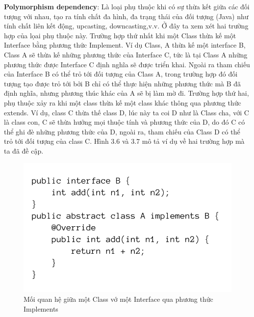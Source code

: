 \documentclass[12pt]{report}
\begin{document}
\noindent \textbf{Polymorphism dependency}: Là loại phụ thuộc khi có sự thừa kết giữa các đối tượng với nhau, tạo ra tính chất đa hình, đa trạng thái của đối tượng (Java) như tính chất liên kết động, upcasting, downcasting,v.v. Ở đây ta xem xét hai trường hợp của lọai phụ thuộc này. Trường hợp thứ nhất khi một Class thừa kế một Interface bằng phương thức Implement. Ví dụ Class, A  thừa kế một interface B, Class A sẽ thừa kế những phương thức của Interface C, tức là tại Class A những phương thức được Interface C định nghĩa sẽ được triển khai. Ngoài ra tham chiếu của Interface B có thể trỏ tới đối tượng của Class A, trong trường hợp đó đối tượng tạo được trỏ tới bởi B chỉ có thể thực hiện những phương thức mà B đã định nghĩa, nhưng phương thúc khác của A sẽ bị làm mờ đi. Trường hợp thứ hai, phụ thuộc xảy ra khi một class thừa kế một class khác thông qua phương thức extends. Ví dụ, class C thừa thế class D, lúc này ta coi D như là Class cha, với C là class con, C sẽ thừa hưởng mọi thuộc tính và phương thức của  D, do đó C có thể ghi đè những phương thức của D, ngoài ra, tham chiếu của Class D có thể trỏ tới đối tượng của class C. Hình 3.6 và 3.7 mô tả ví dụ về hai trường hợp mà ta đã đề cập.
\begin{figure}[!htbp]
	\centering
	\includegraphics[scale=0.35]{images/AimplementsB}
	\caption{Mối quan hệ giữa một Class vớ một Interface qua phương thức Implements}
	\label{fig:A_implemets_B}
\end{figure}
\end{document}
